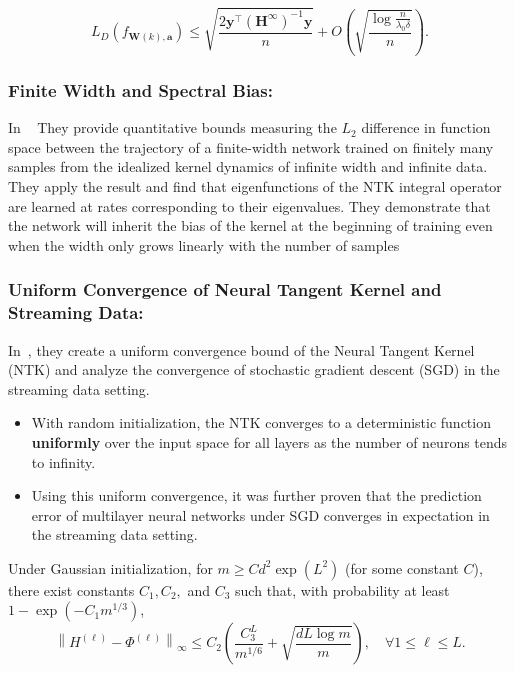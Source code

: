 		
		\[
		L_D(f_{\mathbf{W}(k), \mathbf{a}}) \leq \sqrt{\frac{2 \mathbf{y}^\top (\mathbf{H}^\infty)^{-1} \mathbf{y}}{n}} + O\left( \sqrt{\frac{\log \frac{n}{\lambda_0 \delta}}{n}} \right).
		\]
		
\subsubsection{Finite Width and Spectral Bias:} In ~\cite{rahaman2019spectral}	They provide quantitative bounds measuring the \(L_2\) difference in function space between the trajectory of a finite-width network trained on finitely many samples from the idealized kernel dynamics
of infinite width and infinite data. They apply the result and find that eigenfunctions of the NTK integral operator are learned at rates corresponding to their eigenvalues.
They demonstrate that the network will inherit the bias of the kernel at the beginning of training even when the width only grows linearly with the number of samples

	\subsubsection{Uniform Convergence of Neural Tangent Kernel and Streaming Data:}
	
	 In~\cite{arora2019overparametrized}, they create a uniform convergence bound of the Neural Tangent Kernel (NTK) and analyze the convergence of stochastic gradient descent (SGD) in the streaming data setting.
	

	\begin{itemize}
		\item  With random initialization, the NTK converges to a deterministic function \textbf{uniformly} over the input space for all layers as the number of neurons tends to infinity.
		\item Using this uniform convergence, it was further proven that the prediction error of multilayer neural networks under SGD converges in expectation in the streaming data setting.
	\end{itemize}
	
	Under Gaussian initialization, for \( m \geq C d^2 \exp(L^2) \) (for some constant \( C \)), there exist constants \( C_1, C_2, \) and \( C_3 \) such that, with probability at least \( 1 - \exp(-C_1 m^{1/3}) \),
	\[
	\left\| H^{(\ell)} - \Phi^{(\ell)} \right\|_{\infty} \leq C_2 \left( \frac{C_3^L}{m^{1/6}} + \sqrt{\frac{d L \log m}{m}} \right), \quad \forall 1 \leq \ell \leq L.
	\]
	
